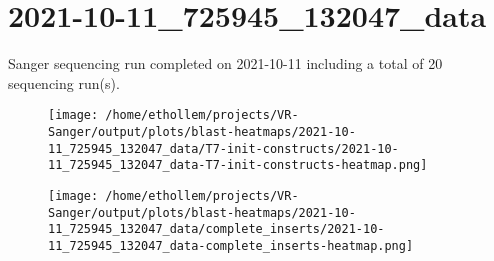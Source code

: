\section{2021-10-11\_725945\_132047\_data}

    Sanger sequencing run completed on 2021-10-11
    including a total of 20 sequencing
    run(s).
    

    \begin{figure}[!h]
        \texttt{[image: /home/ethollem/projects/VR-Sanger/output/plots/blast-heatmaps/2021-10-11\_725945\_132047\_data/T7-init-constructs/2021-10-11\_725945\_132047\_data-T7-init-constructs-heatmap.png]}
        \centering
    \end{figure}


    \begin{figure}[!h]
        \texttt{[image: /home/ethollem/projects/VR-Sanger/output/plots/blast-heatmaps/2021-10-11\_725945\_132047\_data/complete\_inserts/2021-10-11\_725945\_132047\_data-complete\_inserts-heatmap.png]}
        \centering
    \end{figure}

\pagebreak